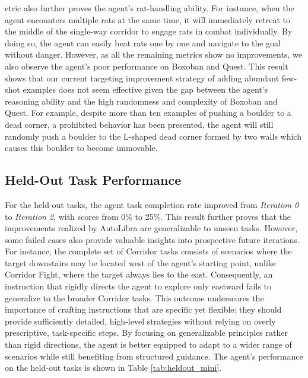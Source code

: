 \begin{flushleft}
etric also further proves the agent's rat-handling ability. For instance, when the agent encounters multiple rats at the same time, it will immediately retreat to the middle of the single-way corridor to engage rats in combat individually. By doing so, the agent can easily beat rats one by one and navigate to the goal without danger. However, as all the remaining metrics show no improvements, we also observe the agent's poor performance on Boxoban and Quest. This result shows that our current targeting improvement strategy of adding abundant few-shot examples does not seem effective given the gap between the agent's reasoning ability and the high randomness and complexity of Boxoban and Quest. For example, despite more than ten examples of pushing a boulder to a dead corner, a prohibited behavior has been presented, the agent will still randomly push a boulder to the L-shaped dead corner formed by two walls which causes this boulder to become immovable.


\subsection{Held-Out Task Performance}
For the held-out tasks, the agent task completion rate improved from \emph{Iteration 0} to \emph{Iteration 2}, with scores from 0\% to 25\%. This result further proves that the improvements realized by AutoLibra are generalizable to unseen tasks. However, some failed cases also provide valuable insights into prospective future iterations. For instance, the complete set of Corridor tasks consists of scenarios where the target downstairs may be located west of the agent’s starting point, unlike Corridor Fight, where the target always lies to the east. Consequently, an instruction that rigidly directs the agent to explore only eastward fails to generalize to the broader Corridor tasks. This outcome underscores the importance of crafting instructions that are specific yet flexible: they should provide sufficiently detailed, high-level strategies without relying on overly prescriptive, task-specific steps. By focusing on generalizable principles rather than rigid directions, the agent is better equipped to adapt to a wider range of scenarios while still benefiting from structured guidance. The agent's performance on the held-out tasks is shown in Table \ref{tab:heldout_mini}.

\end{flushleft}


